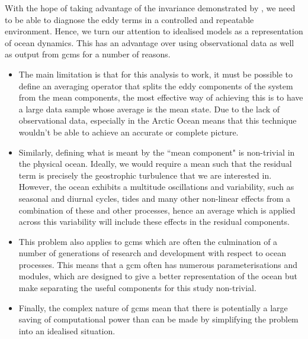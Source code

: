 \documentclass[12pt,a4paper]{report}
\begin{document}
With the hope of taking advantage of the invariance demonstrated by 
\cite{maddison2013eliassen}, we need to be able to diagnose the
eddy terms in a controlled and repeatable environment. Hence, we turn our attention to
idealised models as a representation of ocean dynamics. This has an advantage 
over using observational data as well as output from \glspl{gcm} for a number of reasons.
\begin{itemize}
	\item The main limitation is that for this analysis to work, it must be possible to define an
	averaging operator that splits the eddy components of the system from the mean
	components, the most effective way of achieving this is to have a large data sample
	whose average is the mean state. Due to the lack of observational data, especially in the
	Arctic Ocean means that this  technique wouldn't be able to achieve an accurate or complete
	picture. 
	\item Similarly, defining what is meant by the ``mean component" is non-trivial in the physical ocean. Ideally, we would require a mean such that the residual term is precisely the 
	geostrophic turbulence that we are interested in. However, the ocean exhibits a multitude 
	oscillations and variability, such as seasonal and diurnal cycles, tides and many other
	non-linear effects from a combination of these and other processes, hence an average which
	is applied across this variability will include these effects in the residual components.
	\item This problem also applies to \glspl{gcm} which are often the culmination of 
	a number of generations of research and development with respect to ocean processes.
	This means that a \gls{gcm} often has numerous parameterisations and modules, which are
	designed to give a better representation of the ocean but make separating the useful components
	for this study non-trivial. 
	\item Finally, the complex nature of \glspl{gcm} mean that there is potentially a large saving
	of computational power than can be made by simplifying the problem into an idealised situation.
\end{itemize}
\end{document}
